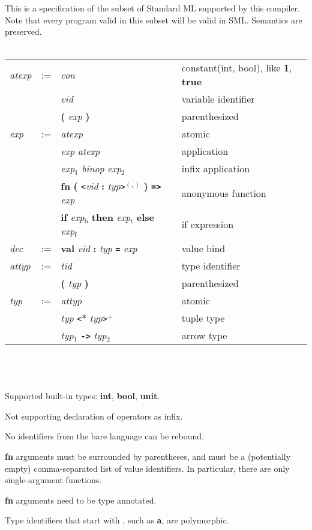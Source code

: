 \documentclass[12pt]{article}
\author{Andrey Yao}
\newcommand{\gm}[1]{\textit{#1}} %
\newcommand{\kw}[1]{\textbf{#1}} %
\newcommand{\hd}[1]{ \gm{#1} & := }
\newcommand{\row}[2]{ & #1 &  & #2\\}
\newcommand{\newrow}[2]{ & &#1 & &#2\\}
\begin{document}
This is a specification of the subset of Standard ML supported by this compiler. Note that every program valid in this subset will be valid in SML. Semantics are preserved.
\\\\
\begin{tabular}{l l l l l}
  \hline %
  \hd{atexp}
  \row{\gm{con}}{constant(int, bool), like \kw{1}, \kw{true} }
  \newrow{\gm{vid}}{variable identifier}
  \newrow{\kw{(} \gm{exp} \kw{)}}{parenthesized}
  \hd{exp}
  \row{\gm{atexp}}{atomic}
  \newrow{\gm{exp} \gm{atexp}}{application}
  \newrow{\gm{exp}$_1$ \gm{binop} \gm{exp}$_2$}{infix application}
  \newrow{\kw{fn} \kw{(} \texttt{<}\gm{vid} \kw{:} \gm{typ}\texttt{>}$^{(,)}$ \kw{)} \kw{\texttt{=>}} \gm{exp}}{anonymous function}
  \newrow{\kw{if} \gm{exp}$_\text{b}$ \kw{then} \gm{exp}$_\text{t}$ \kw{else} \gm{exp}$_\text{f}$}{if expression}
  \hd{dec}
  \row{\kw{val} \gm{vid} \kw{:} \gm{typ} \kw{\texttt{=}} \gm{exp}}{value bind}
  \hline %
  \hd{attyp}
  \row{\gm{tid}}{type identifier}
  \newrow{\kw{(} \gm{typ} \kw{)}}{parenthesized}
  \hd{typ}
  \row{\gm{attyp}}{atomic}
  \newrow{\gm{typ} \texttt{<}{\bf$*$} \gm{typ}\texttt{>}$^+$}{tuple type}
  \newrow{\gm{typ}$_1$ \kw{\texttt{->}} \gm{typ}$_2$}{arrow type}
\end{tabular}
\\\\\\

Supported built-in types: \kw{int}, \kw{bool}, \kw{unit}.

Not supporting declaration of operators as infix.

No identifiers from the bare language can be rebound.

\kw{fn} arguments must be surrounded by parentheses, and must be a (potentially empty) comma-separated list of value identifiers. In particular, there are only single-argument functions.

\kw{fn} arguments need to be type annotated.

Type identifiers that start with \kw{\textquotesingle}, such as \kw{\textquotesingle a}, are polymorphic.
\end{document}
